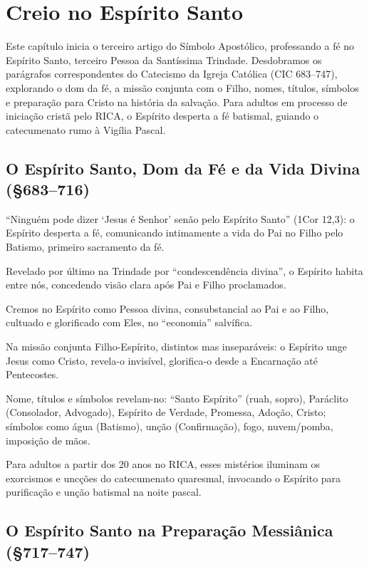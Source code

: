 \chapter{Creio no Espírito Santo}

Este capítulo inicia o terceiro artigo do Símbolo Apostólico, professando a fé no Espírito Santo, terceiro Pessoa da Santíssima Trindade. Desdobramos os parágrafos correspondentes do Catecismo da Igreja Católica (CIC 683--747), explorando o dom da fé, a missão conjunta com o Filho, nomes, títulos, símbolos e preparação para Cristo na história da salvação. Para adultos em processo de iniciação cristã pelo RICA, o Espírito desperta a fé batismal, guiando o catecumenato rumo à Vigília Pascal.

\section{O Espírito Santo, Dom da Fé e da Vida Divina (\S 683--716)}

``Ninguém pode dizer `Jesus é Senhor' senão pelo Espírito Santo'' (1Cor 12,3): o Espírito desperta a fé, comunicando intimamente a vida do Pai no Filho pelo Batismo, primeiro sacramento da fé.

Revelado por último na Trindade por ``condescendência divina'', o Espírito habita entre nós, concedendo visão clara após Pai e Filho proclamados.

Cremos no Espírito como Pessoa divina, consubstancial ao Pai e ao Filho, cultuado e glorificado com Eles, no ``economia'' salvífica.

Na missão conjunta Filho-Espírito, distintos mas inseparáveis: o Espírito unge Jesus como Cristo, revela-o invisível, glorifica-o desde a Encarnação até Pentecostes.

Nome, títulos e símbolos revelam-no: ``Santo Espírito'' (ruah, sopro), Paráclito (Consolador, Advogado), Espírito de Verdade, Promessa, Adoção, Cristo; símbolos como água (Batismo), unção (Confirmação), fogo, nuvem/pomba, imposição de mãos.

Para adultos a partir dos 20 anos no RICA, esses mistérios iluminam os exorcismos e uncções do catecumenato quaresmal, invocando o Espírito para purificação e unção batismal na noite pascal.

\section{O Espírito Santo na Preparação Messiânica (\S 717--747)}

